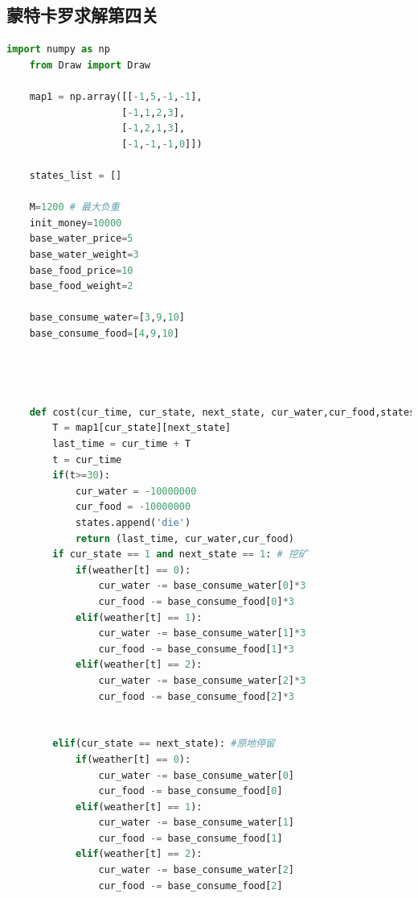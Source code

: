 \documentclass[withoutpreface,bwprint]{cumcmthesis} %
\begin{document}
\begin{appendices}
\section{蒙特卡罗求解第四关}
\begin{lstlisting}[language=python]
    import numpy as np
    from Draw import Draw
    
    map1 = np.array([[-1,5,-1,-1],
                    [-1,1,2,3],
                    [-1,2,1,3],
                    [-1,-1,-1,0]])
    
    states_list = []
    
    M=1200 # 最大负重
    init_money=10000
    base_water_price=5
    base_water_weight=3
    base_food_price=10
    base_food_weight=2
    
    base_consume_water=[3,9,10]
    base_consume_food=[4,9,10]
    
    
    
    
    def cost(cur_time, cur_state, next_state, cur_water,cur_food,states,weather):
        T = map1[cur_state][next_state]
        last_time = cur_time + T
        t = cur_time
        if(t>=30):
            cur_water = -10000000
            cur_food = -10000000
            states.append('die')
            return (last_time, cur_water,cur_food)
        if cur_state == 1 and next_state == 1: # 挖矿
            if(weather[t] == 0):
                cur_water -= base_consume_water[0]*3
                cur_food -= base_consume_food[0]*3
            elif(weather[t] == 1):
                cur_water -= base_consume_water[1]*3
                cur_food -= base_consume_food[1]*3
            elif(weather[t] == 2):
                cur_water -= base_consume_water[2]*3
                cur_food -= base_consume_food[2]*3
    
    
        elif(cur_state == next_state): #原地停留
            if(weather[t] == 0):
                cur_water -= base_consume_water[0]
                cur_food -= base_consume_food[0]
            elif(weather[t] == 1):
                cur_water -= base_consume_water[1]
                cur_food -= base_consume_food[1]
            elif(weather[t] == 2):
                cur_water -= base_consume_water[2]
                cur_food -= base_consume_food[2]
    

\end{lstlisting}
\end{appendices}
\end{document}

